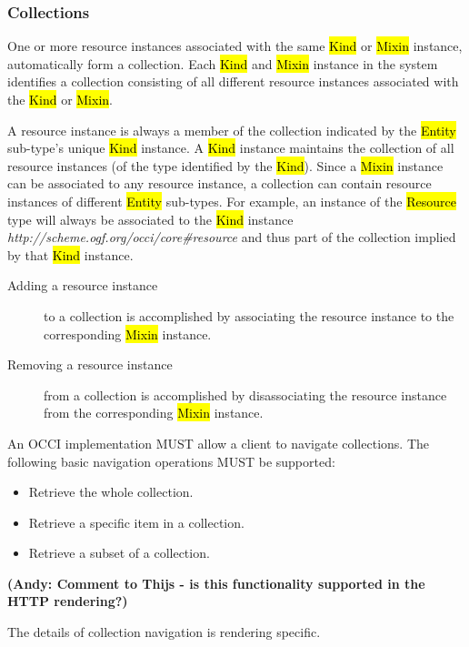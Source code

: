 \documentclass[10pt,a4paper]{article}
\begin{document}
\subsubsection{Collections}
\label{sec:collection}
One or more resource instances associated with the same \hl{Kind} or \hl{Mixin}
instance, automatically form a collection.
Each \hl{Kind} and \hl{Mixin} instance in the system identifies a collection
consisting of all different resource instances associated with the \hl{Kind} or
\hl{Mixin}.

A resource instance is always a member of the collection indicated by the
\hl{Entity} sub-type's unique \hl{Kind} instance. A \hl{Kind} instance maintains
the collection of all resource instances (of the type identified by the
\hl{Kind}).
%
Since a \hl{Mixin} instance can be associated to any resource instance, a
collection can contain resource instances of different \hl{Entity} sub-types.
%
For example, an instance of the \hl{Resource} type will always be associated
to the \hl{Kind} instance
\textit{http://scheme.ogf.org/occi/core\#resource} and thus part of the
collection implied by that \hl{Kind} instance.
\begin{description}
\item[Adding a resource instance] to a collection is accomplished by associating the
 resource instance to the corresponding \hl{Mixin} instance.
\item[Removing a resource instance] from a collection is accomplished by disassociating
 the resource instance from the corresponding \hl{Mixin} instance.
\end{description}
%
An OCCI implementation MUST allow a client to navigate collections. The
following basic navigation operations MUST be supported:
\begin{itemize}
\item Retrieve the whole collection.
\item Retrieve a specific item in a collection.
\item Retrieve a subset of a collection.
\end{itemize}

\textbf{(Andy: Comment to Thijs - is this functionality supported in the HTTP rendering?)}

The details of collection navigation is rendering specific.
\end{document}
